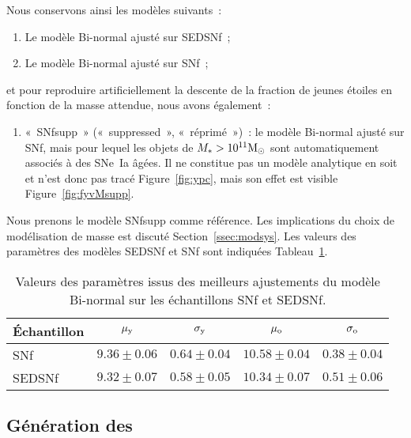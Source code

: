 \documentclass[../main/main.tex]{subfiles}
\begin{document}
Nous conservons ainsi les modèles suivants~:
\begin{enumerate}
    \item Le modèle Bi-normal ajusté sur SEDSNf~;
    \item Le modèle Bi-normal ajusté sur SNf~;
\end{enumerate}
et pour reproduire artificiellement la descente de la fraction de jeunes étoiles
en fonction de la masse attendue, nous avons également~:
\begin{enumerate}[resume]
    \item «~SNfsupp~» («~suppressed~», «~réprimé~»)~: le modèle Bi-normal ajusté
        sur SNf, mais pour lequel les objets de $M_* > 10^{11}\si{\Msun}$ sont
        automatiquement associés à des SNe~Ia âgées. Il ne constitue pas un
        modèle analytique en soit et n'est donc pas tracé Figure~\ref{fig:ypc},
        mais son effet est visible Figure~\ref{fig:fyvMsupp}.
\end{enumerate}

Nous prenons le modèle SNfsupp comme référence. Les implications du choix de
modélisation de masse est discuté Section~\ref{ssec:modsys}. Les valeurs des
paramètres des modèles SEDSNf et SNf sont indiquées
Tableau~\ref{tab:massmodelresults}.

\begin{table}[ht]
    \centerfloat
    \caption[Valeurs des paramètres issus des meilleurs ajustements du modèle
    Bi-normal sur les échantillons SNf et SEDSNf]{Valeurs des paramètres issus
        des meilleurs ajustements du modèle Bi-normal sur les échantillons SNf
    et SEDSNf.}
    \label{tab:massmodelresults}
    \begin{tabular}{lcccc}
        \toprule
        Échantillon              &
                $\mu_{\rm y} $   &
                $\sigma_{\rm y}$ &
                $\mu_{\rm o} $   &
                $\sigma_{\rm o}$ \\
        \midrule
        SNf    & $9.36  \pm 0.06$
               & $0.64  \pm 0.04$
               & $10.58 \pm 0.04$
               & $0.38  \pm 0.04$
               \\
        SEDSNf & $9.32  \pm 0.07$
               & $0.58  \pm 0.05$
               & $10.34 \pm 0.07$
               & $0.51  \pm 0.06$
               \\
        \bottomrule
    \end{tabular}
\end{table}

\subsection{Génération des \hostlib}\label{ssec:inpgen}
\end{document}

